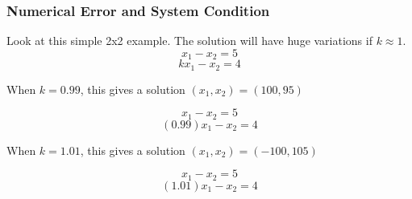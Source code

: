 \documentclass[fleqn]{beamer} %
\newcommand{\sectiontitleIV}{Numerical Error and System Condition}
\begin{document}
\begin{frame}\small 
  \frametitle{\sectiontitleIV}
 
\begin{fleqn}
	  
	  Look at this simple 2x2 example. The solution will have huge variations if $ k\approx 1 $. \\
	
		\[x_1 - x_2=5\] 
		\[kx_1 - x_2=4\]
	
	  When $ k = 0.99 $, this gives a solution $(x_1,x_2)=(100, 95)$	
	
		\[x_1 - x_2=5\] 
		\[(0.99)x_1 - x_2=4\]
	
	 When $ k = 1.01 $, this gives a solution $(x_1,x_2)=(-100, 105)$	
	
		\[x_1 - x_2=5\] 
		\[(1.01)x_1 - x_2=4\]
		
\end{fleqn}

\end{frame}
\end{document}
